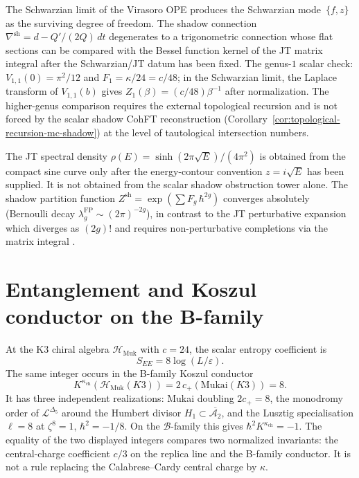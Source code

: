 \begin{remark}
The Schwarzian limit of the Virasoro OPE produces the
Schwarzian mode~$\{f, z\}$ as the surviving degree of
freedom. The shadow connection
$\nabla^{\mathrm{sh}} = d - Q'/(2Q)\,dt$
degenerates to a trigonometric connection whose flat
sections can be compared with the Bessel function kernel of the
JT matrix integral after the Schwarzian/JT datum has been fixed.
The genus-$1$ scalar check:
$V_{1,1}(0) = \pi^2/12$ and
$F_1 = \kappa/24 = c/48$; in the Schwarzian limit,
the Laplace transform of $V_{1,1}(b)$ gives
$Z_1(\beta) = (c/48)\beta^{-1}$ after normalization. The
higher-genus comparison requires the external topological recursion
and is not forced by the scalar shadow CohFT reconstruction
(Corollary~\ref{cor:topological-recursion-mc-shadow})
at the level of tautological intersection numbers.
\end{remark}

\begin{remark}
\label{rem:ent-jt-matrix-model}
The JT spectral density
$\rho(E) = \sinh(2\pi\sqrt{E})/(4\pi^2)$ is obtained from the
compact sine curve only after the energy-contour convention
\(z=i\sqrt E\) has been supplied. It is not obtained from the scalar
shadow obstruction tower alone.
The shadow partition function
$Z^{\mathrm{sh}} = \exp(\sum F_g\,\hbar^{2g})$
converges absolutely (Bernoulli decay
$\lambda_g^{\mathrm{FP}} \sim (2\pi)^{-2g}$),
in contrast to the JT perturbative expansion which
diverges as $(2g)!$ and requires
non-perturbative completions
via the matrix integral \cite{SSS19}.
\end{remark}

\section{Entanglement and Koszul conductor on the B-family}
\label{sec:ent-supplement}

\begin{remark}
\label{rem:ent-cthird-K3}
At the K3 chiral algebra $\mathcal{H}_{\mathrm{Muk}}$ with
$c=24$, the scalar entropy coefficient is
\[
S_{EE}=8\log(L/\varepsilon).
\]
The same integer occurs in the B-family Koszul conductor
\[
K^{\kappa_{\mathrm{ch}}}
(\mathcal{H}_{\mathrm{Muk}}(K3))
=2\,c_+(\mathrm{Mukai}(K3))=8.
\]
It has three independent realizations: Mukai doubling
$2c_+=8$, the monodromy order of $\mathcal L^{\Delta_5}$ around the
Humbert divisor $H_1\subset\overline{\mathcal A_2}$, and the Lusztig
specialisation $\ell=8$ at $\zeta^8=1$, $\hbar^2=-1/8$.  On the
$\mathcal B$-family this gives
$\hbar^2 K^{\kappa_{\mathrm{ch}}}=-1$.
The equality of the two displayed integers compares two normalized
invariants: the central-charge coefficient $c/3$ on the replica line
and the B-family conductor.  It is not a rule replacing the
Calabrese--Cardy central charge by $\kappa$.
\end{remark}

